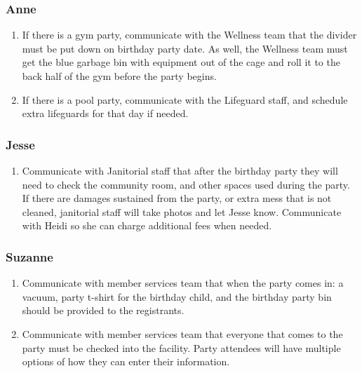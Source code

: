 \documentclass[
]{report}
\providecommand{\tightlist}{%
  \setlength{\itemsep}{0pt}\setlength{\parskip}{0pt}}\usepackage{longtable,booktabs,array}
\begin{document}
\hypertarget{anne-1}{%
\subsubsection{Anne}\label{anne-1}}

\begin{enumerate}
\def\labelenumi{\arabic{enumi}.}
\setcounter{enumi}{11}
\item
  If there is a gym party, communicate with the Wellness team that the
  divider must be put down on birthday party date. As well, the Wellness
  team must get the blue garbage bin with equipment out of the cage and
  roll it to the back half of the gym before the party begins.
\item
  If there is a pool party, communicate with the Lifeguard staff, and
  schedule extra lifeguards for that day if needed.
\end{enumerate}

\hypertarget{jesse}{%
\subsubsection{Jesse}\label{jesse}}

\begin{enumerate}
\def\labelenumi{\arabic{enumi}.}
\setcounter{enumi}{13}
\tightlist
\item
  Communicate with Janitorial staff that after the birthday party they
  will need to check the community room, and other spaces used during
  the party. If there are damages sustained from the party, or extra
  mess that is not cleaned, janitorial staff will take photos and let
  Jesse know. Communicate with Heidi so she can charge additional fees
  when needed.
\end{enumerate}

\hypertarget{suzanne}{%
\subsubsection{Suzanne}\label{suzanne}}

\begin{enumerate}
\def\labelenumi{\arabic{enumi}.}
\setcounter{enumi}{14}
\item
  Communicate with member services team that when the party comes in: a
  vacuum, party t-shirt for the birthday child, and the birthday party
  bin should be provided to the registrants.
\item
  Communicate with member services team that everyone that comes to the
  party must be checked into the facility. Party attendees will have
  multiple options of how they can enter their information.
\end{enumerate}
\end{document}
